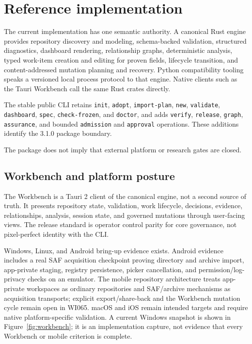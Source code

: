 \documentclass[11pt]{article}
\begin{document}
\section{Reference implementation}

The current implementation has one semantic authority. A canonical Rust engine provides
repository discovery and modeling, schema-backed validation, structured diagnostics,
dashboard rendering, relationship graphs, deterministic analysis, typed work-item creation
and editing for proven fields, lifecycle transition, and content-addressed mutation
planning and recovery. Python compatibility tooling speaks a versioned local process
protocol to that engine. Native clients such as the Tauri Workbench call the same Rust
crates directly.

\begin{sloppypar}
The stable public CLI retains \texttt{init}, \texttt{adopt}, \texttt{import-plan},
\texttt{new}, \texttt{validate}, \texttt{dashboard}, \texttt{spec},
\texttt{check-frozen}, and \texttt{doctor}, and adds \texttt{verify}, \texttt{release},
\texttt{graph}, \texttt{assurance}, and bounded \texttt{admission} and
\texttt{approval} operations. These additions identify the 3.1.0 package boundary.

The package does not imply that external platform or research gates are closed.
\end{sloppypar}

\subsection{Workbench and platform posture}

The Workbench is a Tauri 2 client of the canonical engine, not a second source of truth.
It presents repository state, validation, work lifecycle, decisions, evidence,
relationships, analysis, session state, and governed mutations through user-facing views.
The release standard is operator control parity for core governance, not pixel-perfect
identity with the CLI.

Windows, Linux, and Android bring-up evidence exists. Android evidence includes a real SAF
acquisition checkpoint proving directory and archive import, app-private staging, registry
persistence, picker cancellation, and permission/log-privacy checks on an emulator. The
mobile repository architecture treats app-private workspaces as ordinary repositories and
SAF/archive mechanisms as acquisition transports; explicit export/share-back and the
Workbench mutation cycle remain open in WI065. macOS and iOS remain intended targets and
require native platform-specific validation. A current Windows snapshot is shown in
Figure~\ref{fig:workbench}; it is an implementation capture, not evidence that every
Workbench or mobile criterion is complete.
\end{document}
